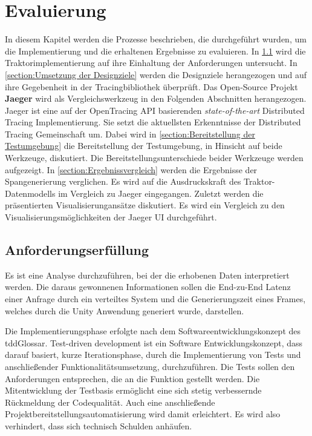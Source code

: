 %

\chapter{Evaluierung}
\label{chapter:Evaluierung}
In diesem Kapitel werden die Prozesse beschrieben, die durchgeführt wurden, um die Implementierung und die erhaltenen Ergebnisse zu evaluieren. In \cref{section:Anforderungserfüllung} wird die Traktorimplementierung auf ihre Einhaltung der Anforderungen  untersucht. In \cref{section:Umsetzung der Designziele} werden die Designziele herangezogen und auf ihre Gegebenheit in der Tracingbibliothek überprüft. Das Open-Source Projekt \textbf{Jaeger} wird als Vergleichswerkzeug in den Folgenden Abschnitten herangezogen. Jaeger ist eine auf der OpenTracing API basierenden \emph{state-of-the-art} Distributed Tracing Implementierung. Sie setzt die aktuellsten Erkenntnisse der Distributed Tracing Gemeinschaft um. Dabei wird in \cref{section:Bereitstellung der Testumgebung} die Bereitstellung der Testumgebung, in Hinsicht auf beide Werkzeuge, diskutiert. Die Bereitstellungsunterschiede beider Werkzeuge werden aufgezeigt. In \cref{section:Ergebnissvergleich} werden die Ergebnisse der Spangenerierung verglichen. Es wird auf die Ausdruckskraft des Traktor-Datenmodells im Vergleich zu Jaeger eingegangen. Zuletzt werden die präsentierten Visualisierungansätze diskutiert. Es wird ein Vergleich zu den Visualisierungsmöglichkeiten der Jaeger UI durchgeführt.

\section{Anforderungserfüllung}
\label{section:Anforderungserfüllung}

Es ist eine Analyse durchzuführen, bei der die erhobenen Daten interpretiert werden. Die daraus gewonnenen Informationen sollen die End-zu-End Latenz einer Anfrage durch ein verteiltes System und die Generierungszeit eines Frames, welches durch die Unity Anwendung generiert wurde, darstellen. 

Die Implementierungsphase erfolgte nach dem Softwareentwicklungskonzept des \gls{tddGlossar}. Test-driven development ist ein Software Entwicklungskonzept, dass darauf basiert, kurze Iterationsphase, durch die Implementierung von Tests und anschließender Funktionalitätsumsetzung, durchzuführen. Die Tests sollen den Anforderungen entsprechen, die an die Funktion gestellt werden. Die Mitentwicklung der Testbasis ermöglicht eine sich stetig verbessernde Rückmeldung der Codequalität. Auch eine anschließende Projektbereitstellungsautomatisierung wird damit erleichtert. Es wird also verhindert, dass sich technisch Schulden anhäufen.

